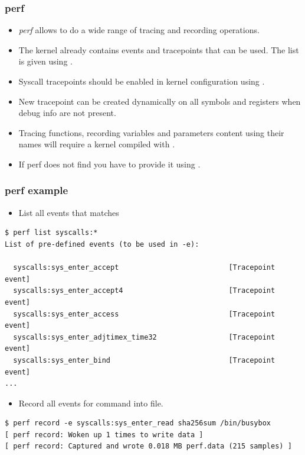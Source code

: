 \begin{frame}
  \frametitle{perf}
  \begin{itemize}
    \item {\em perf} allows to do a wide range of tracing and recording operations.
    \item The kernel already contains events and tracepoints that can be used.
          The list is given using .
    \item Syscall tracepoints should be enabled in kernel configuration using
          .
    \item New tracepoint can be created dynamically on all symbols and registers
          when debug info are not present.
    \item Tracing functions, recording variables and parameters content using
          their names will require a kernel compiled with
          .
    \item If perf does not find  you have to provide it
          using .
  \end{itemize}
\end{frame}

\begin{frame}[fragile]
  \frametitle{perf example}
  \begin{itemize}
    \item List all events that matches 
  \end{itemize}
  \begin{block}{}
    \begin{verbatim}
$ perf list syscalls:*
List of pre-defined events (to be used in -e):

  syscalls:sys_enter_accept                          [Tracepoint event]
  syscalls:sys_enter_accept4                         [Tracepoint event]
  syscalls:sys_enter_access                          [Tracepoint event]
  syscalls:sys_enter_adjtimex_time32                 [Tracepoint event]
  syscalls:sys_enter_bind                            [Tracepoint event]
...
    \end{verbatim}
  \end{block}
  \begin{itemize}
    \item Record all  events for 
          command into  file.
  \end{itemize}
  \begin{block}{}
    \begin{verbatim}
$ perf record -e syscalls:sys_enter_read sha256sum /bin/busybox
[ perf record: Woken up 1 times to write data ]
[ perf record: Captured and wrote 0.018 MB perf.data (215 samples) ]
    \end{verbatim}
  \end{block}
\end{frame}

